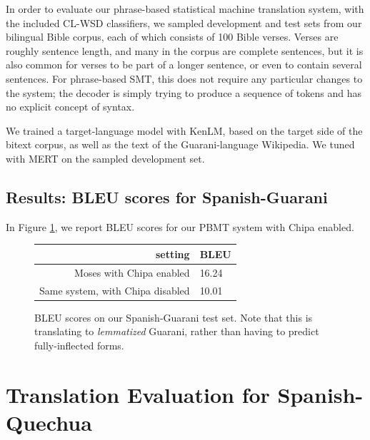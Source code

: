 In order to evaluate our phrase-based statistical machine translation system,
with the included CL-WSD classifiers, we sampled development and test sets from
our bilingual Bible corpus, each of which consists of 100 Bible verses. Verses
are roughly sentence length, and many in the corpus are complete sentences, but
it is also common for verses to be part of a longer sentence, or even to
contain several sentences.  For phrase-based SMT, this does not require any
particular changes to the system; the decoder is simply trying to produce a
sequence of tokens and has no explicit concept of syntax.

We trained a target-language model with KenLM, based on the target side of the
bitext corpus, as well as the text of the Guarani-language Wikipedia.
We tuned with MERT on the sampled development set.


\subsection{Results: BLEU scores for Spanish-Guarani}

In Figure \ref{fig:bleu-es-gn}, we report BLEU scores for our PBMT system with
Chipa enabled.

\begin{figure}
  \begin{centering}
  \begin{tabulary}{\textwidth}{|R|L|}
    \hline
    setting & BLEU \\
    \hline
    Moses with Chipa enabled &  16.24 \\
    \hline
    Same system, with Chipa disabled &  10.01 \\
    \hline
  \end{tabulary}
  \end{centering}
  \caption{BLEU scores on our Spanish-Guarani test set. Note that this is
  translating to \emph{lemmatized} Guarani, rather than having to predict
  fully-inflected forms.}
  \label{fig:bleu-es-gn}
\end{figure}


\section{Translation Evaluation for Spanish-Quechua}

